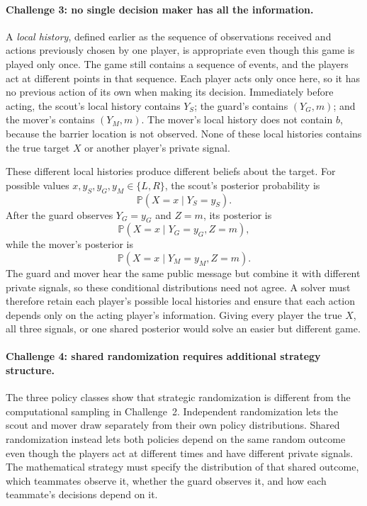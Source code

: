\paragraph{Challenge 3: no single decision maker has all the information.}
A \emph{local history}, defined earlier as the sequence of observations received and actions previously chosen by one player, is appropriate even though this game is played only once. The game still contains a sequence of events, and the players act at different points in that sequence. Each player acts only once here, so it has no previous action of its own when making its decision. Immediately before acting, the scout's local history contains $Y_S$; the guard's contains $(Y_G,m)$; and the mover's contains $(Y_M,m)$. The mover's local history does not contain $b$, because the barrier location is not observed. None of these local histories contains the true target $X$ or another player's private signal.

These different local histories produce different beliefs about the target. For possible values $x,y_S,y_G,y_M\in\{L,R\}$, the scout's posterior probability is
\[
    \mathbb{P}(X=x\mid Y_S=y_S).
\]
After the guard observes $Y_G=y_G$ and $Z=m$, its posterior is
\[
    \mathbb{P}(X=x\mid Y_G=y_G,Z=m),
\]
while the mover's posterior is
\[
    \mathbb{P}(X=x\mid Y_M=y_M,Z=m).
\]
The guard and mover hear the same public message but combine it with different private signals, so these conditional distributions need not agree. A solver must therefore retain each player's possible local histories and ensure that each action depends only on the acting player's information. Giving every player the true $X$, all three signals, or one shared posterior would solve an easier but different game.

\paragraph{Challenge 4: shared randomization requires additional strategy structure.}
The three policy classes show that strategic randomization is different from the computational sampling in Challenge~2. Independent randomization lets the scout and mover draw separately from their own policy distributions. Shared randomization instead lets both policies depend on the same random outcome even though the players act at different times and have different private signals. The mathematical strategy must specify the distribution of that shared outcome, which teammates observe it, whether the guard observes it, and how each teammate's decisions depend on it.

